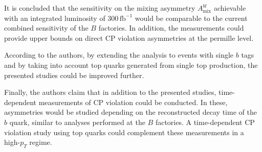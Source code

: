 It is concluded that the sensitivity on the mixing asymmetry $A^{bl}_\text{mix}$ achievable with an integrated luminosity of $300\,\text{fb}^{-1}$ would be comparable to the current combined sensitivity of the $B$ factories.
In addition, the measurements could provide upper bounds on direct CP violation asymmetries at the permille level.

According to the authors, by extending the analysis to events with single $b$ tags and by taking into account top quarks generated from single top production, the presented studies could be improved further.

Finally, the authors claim that in addition to the presented studies, time-dependent measurements of CP violation could be conducted.
In these, asymmetries would be studied depending on the reconstructed decay time of the $b$ quark, similar to analyses performed at the $B$ factories.
A time-dependent CP violation study using top quarks could complement these measurements in a high-$p_T$ regime.
